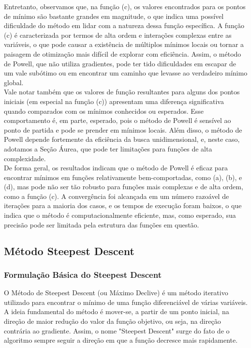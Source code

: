 \documentclass[a4paper, 12pt]{article}
\begin{document}
Entretanto, observamos que, na função (c), os valores encontrados para os pontos de mínimo são bastante grandes em magnitude, o que indica uma possível dificuldade do método em lidar com a natureza dessa função específica. A função (c) é caracterizada por termos de alta ordem e interações complexas entre as variáveis, o que pode causar a existência de múltiplos mínimos locais ou tornar a paisagem de otimização mais difícil de explorar com eficiência. Assim, o método de Powell, que não utiliza gradientes, pode ter tido dificuldades em escapar de um vale subótimo ou em encontrar um caminho que levasse ao verdadeiro mínimo global.\\

Vale notar também que os valores de função resultantes para alguns dos pontos iniciais (em especial na função (c)) apresentam uma diferença significativa quando comparados com os mínimos conhecidos ou esperados. Esse comportamento é, em parte, esperado, pois o método de Powell é sensível ao ponto de partida e pode se prender em mínimos locais. Além disso, o método de Powell depende fortemente da eficiência da busca unidimensional, e, neste caso, adotamos a Seção Áurea, que pode ter limitações para funções de alta complexidade.\\

De forma geral, os resultados indicam que o método de Powell é eficaz para encontrar mínimos em funções relativamente bem-comportadas, como (a), (b), e (d), mas pode não ser tão robusto para funções mais complexas e de alta ordem, como a função (c). A convergência foi alcançada em um número razoável de iterações para a maioria dos casos, e os tempos de execução foram baixos, o que indica que o método é computacionalmente eficiente, mas, como esperado, sua precisão pode ser limitada pela estrutura das funções em questão.\\




\newpage
\subsection{Método Steepest Descent}

\subsubsection{Formulação Básica do Steepest Descent}

O Método de Steepest Descent (ou Máximo Declive) é um método iterativo utilizado para encontrar o mínimo de uma função diferenciável de várias variáveis. A ideia fundamental do método é mover-se, a partir de um ponto inicial, na direção de maior redução do valor da função objetivo, ou seja, na direção contrária ao gradiente. Assim, o nome "Steepest Descent" surge do fato de o algoritmo sempre seguir a direção em que a função decresce mais rapidamente.\\
\end{document}
